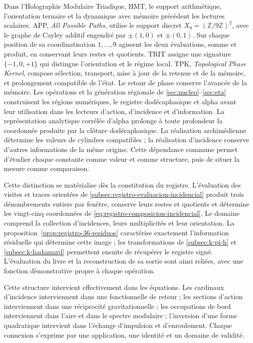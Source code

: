 Dans l'Holographie Modulaire Triadique, HMT, le support arithmétique, l'orientation
ternaire et la dynamique avec mémoire précèdent les lectures scalaires.
APP, \emph{All Possible Paths}, utilise le support discret
\(X_9=(\mathbb Z/9\mathbb Z)^2\), avec le graphe de Cayley additif
engendré par \(\pm(1,0)\) et \(\pm(0,1)\). Sur chaque position
de sa coordinatisation \(1,\ldots,9\) agissent les deux évaluations, somme et
produit, en conservant leurs restes et quotients. TRIT assigne une signature
\(\{-1,0,+1\}\) qui distingue l'orientation et le régime local.
TPK, \emph{Topological Phase Kernel}, compose sélection, transport,
mise à jour de la retenue et de la mémoire, et prolongement compatible de l'état.
Le retour de phase conserve l'avancée de la mémoire. Les opérations et la
génération régionale de \ref{sec:nucleo}--\ref{sec:eta} construisent les
régions numériques, le registre dodécaphasique et alpha avant leur utilisation dans
les lecteurs d'action, d'incidence et d'information.
La représentation analytique corrélée d'alpha prolonge à toute
profondeur la coordonnée produite par la clôture dodécaphasique.
La réalisation archimédienne détermine les valeurs de cylindres compatibles ;
la réalisation d'incidence conserve d'autres informations de la même origine.
Cette dépendance commune permet d'étudier chaque constante comme valeur et
comme structure, puis de situer la mesure comme comparaison.

Cette distinction se matérialise dès la constitution du registre.
L'évaluation des visites et traces orientées de
\ref{subsec:registro-evaluacion-incidencial} produit trois dénombrements entiers
par fenêtre, conserve leurs restes et quotients et détermine les vingt-cinq
coordonnées de \eqref{eq:registro-composicion-incidencial}. Le domaine
comprend la collection d'incidences, leurs multiplicités et leur orientation.
La proposition~\ref{prop:registro-36-residuos} caractérise exactement
l'information résiduelle qui détermine cette image ; les transformations
de \ref{subsec:k-pi-h} et \ref{subsec:k-hadamard} permettent ensuite de récupérer
le registre signé. L'évaluation du livre et la
reconstruction de sa sortie sont ainsi reliées, avec une fonction démonstrative propre à
chaque opération.

Cette structure intervient effectivement dans les équations.
Les cardinaux d'incidence interviennent dans
une fonctionnelle de retour ; les sections d'action interviennent dans une
réciprocité gravitationnelle ; les occupations de bord interviennent dans l'aire
et dans le spectre modulaire ; l'inversion d'une forme quadratique intervient
dans l'échange d'impulsion et d'enroulement. Chaque connexion s'exprime
par une application, une identité et un domaine de validité.


